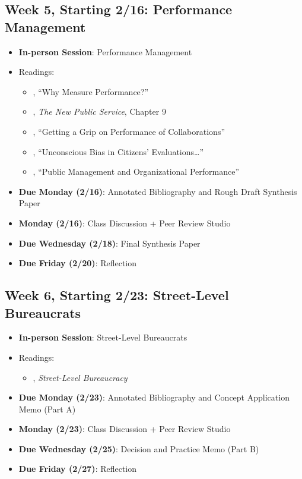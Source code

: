 \documentclass[11pt]{article}     %
\begin{document}
\subsection*{Week 5, Starting 2/16: Performance Management}
\begin{itemize}
    \item \textbf{In-person Session}: Performance Management
    \item Readings:
        \begin{itemize}
            \item \citet{Behn2003}, ``Why Measure Performance?''
            \item \citet{Denhardt2015}, \emph{The New Public Service}, Chapter 9
            \item \citet{douglas2021}, ``Getting a Grip on Performance of Collaborations''
            \item \citet{marvel2015}, ``Unconscious Bias in Citizens' Evaluations\dots''
            \item \citet{nicholson-crotty2004}, ``Public Management and Organizational Performance''
        \end{itemize}
    \item \textbf{Due Monday (2/16)}: Annotated Bibliography and Rough Draft Synthesis Paper
    \item \textbf{Monday (2/16)}: Class Discussion + Peer Review Studio
    \item \textbf{Due Wednesday (2/18)}: Final Synthesis Paper
    \item \textbf{Due Friday (2/20)}: Reflection
\end{itemize}

\subsection*{Week 6, Starting 2/23: Street-Level Bureaucrats}
\begin{itemize}
    \item \textbf{In-person Session}: Street-Level Bureaucrats
    \item Readings:
        \begin{itemize}
            \item \citet{Lipsky2010}, \emph{Street-Level Bureaucracy}
        \end{itemize}
    \item \textbf{Due Monday (2/23)}: Annotated Bibliography and Concept Application Memo (Part A)
    \item \textbf{Monday (2/23)}: Class Discussion + Peer Review Studio
    \item \textbf{Due Wednesday (2/25)}: Decision and Practice Memo (Part B)
    \item \textbf{Due Friday (2/27)}: Reflection
\end{itemize}
\end{document}
